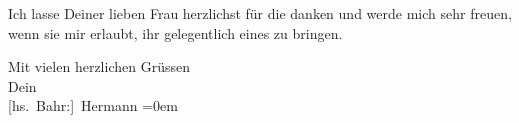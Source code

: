 \pstart
           Ich lasse Deiner lieben Frau
               herzlichst für die \label{K_L01633-1v}\label{K_L01633-1} danken und werde
               mich sehr freuen, wenn sie mir erlaubt, ihr gelegentlich eines zu bringen.\pend
           
\pstart
           Mit vielen herzlichen Grüssen{\\[\baselineskip]}Dein{\\[\baselineskip]}\spacefill\mbox{{[}hs. Bahr:{]} Hermann}\pend
           \leftskip=0em{}\endnumbering{}  \newcommand{\dateiname}{L01633}\newcommand{\titel}{Hermann Bahr an Arthur Schnitzler, 16. 10. 1906}\newcommand{\editorInnen}{Herausgegeben von Martin Anton Müller}

